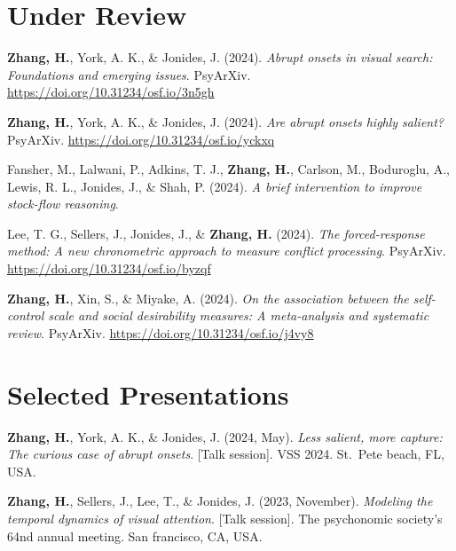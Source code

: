 \documentclass[11pt,a4paper,]{awesome-cv}
\begin{document}
\hypertarget{under-review}{%
\section{Under Review}\label{under-review}}

\hypertarget{bibliography}{}
\leavevmode{}%
\textbf{Zhang, H.}, York, A. K., \& Jonides, J. (2024). \emph{Abrupt
onsets in visual search: Foundations and emerging issues}. PsyArXiv.
\url{https://doi.org/10.31234/osf.io/3n5gh}

\leavevmode{}%
\textbf{Zhang, H.}, York, A. K., \& Jonides, J. (2024). \emph{Are abrupt
onsets highly salient?} PsyArXiv.
\url{https://doi.org/10.31234/osf.io/yckxq}

\leavevmode{}%
Fansher, M., Lalwani, P., Adkins, T. J., \textbf{Zhang, H.}, Carlson,
M., Boduroglu, A., Lewis, R. L., Jonides, J., \& Shah, P. (2024).
\emph{A brief intervention to improve stock-flow reasoning}.

\leavevmode{}%
Lee, T. G., Sellers, J., Jonides, J., \& \textbf{Zhang, H.} (2024).
\emph{The forced-response method: A new chronometric approach to measure
conflict processing}. PsyArXiv.
\url{https://doi.org/10.31234/osf.io/byzqf}

\leavevmode{}%
\textbf{Zhang, H.}, Xin, S., \& Miyake, A. (2024). \emph{On the
association between the self-control scale and social desirability
measures: A meta-analysis and systematic review}. PsyArXiv.
\url{https://doi.org/10.31234/osf.io/j4vy8}

\hypertarget{selected-presentations}{%
\section{Selected Presentations}\label{selected-presentations}}

\hypertarget{bibliography}{}
\leavevmode{}%
\textbf{Zhang, H.}, York, A. K., \& Jonides, J. (2024, May). \emph{Less
salient, more capture: The curious case of abrupt onsets}. {[}Talk
session{]}. VSS 2024. St.~Pete beach, FL, USA.

\leavevmode{}%
\textbf{Zhang, H.}, Sellers, J., Lee, T., \& Jonides, J. (2023,
November). \emph{Modeling the temporal dynamics of visual attention}.
{[}Talk session{]}. The psychonomic society's 64nd annual meeting. San
francisco, CA, USA.
\end{document}
